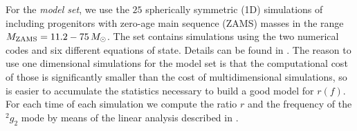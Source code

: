 {For the {\it model set}, we use the $25$ spherically symmetric (1D) simulations of \citep{Torres:2019a}
including progenitors with zero-age main sequence (ZAMS) masses in the range 
$M_{\mathrm{ZAMS}} = 11.2 - 75 \, M_{\odot}$. The set contains simulations using the
 two numerical codes and six different equations of state. Details can be found in
 \citep{Torres:2019a}. The reason to use one dimensional simulations for the model set
 is that the computational cost of those is significantly smaller than the cost of multidimensional
 simulations, so is easier to accumulate the statistics necessary to build a good model for $r(f)$.}
 {For each time of each simulation we compute the ratio $r$ and the frequency of the $^2g_2$ mode by means of the linear analysis
 described in \cite{Torres:2018,Torres:2019a,Torres:2019b}. } 
 
